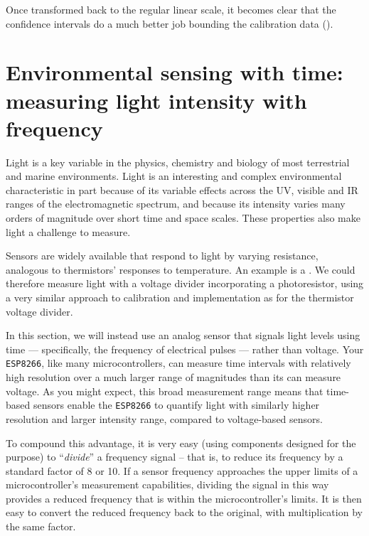 Once transformed back to the regular linear scale, it becomes clear that the confidence intervals do a much better job bounding the calibration data ().








\newpage


\section{Environmental sensing with time: measuring light intensity with frequency}
Light is a key variable in the physics, chemistry and biology of most terrestrial and marine environments.
Light is an interesting and complex environmental characteristic in part because of its variable effects across the UV, visible and IR ranges of the electromagnetic spectrum, and because its intensity varies many orders of magnitude over short time and space scales.
These properties also make light a challenge to measure.

Sensors are widely available that respond to light by varying resistance, analogous to thermistors' responses to temperature.
An example is a .
We could therefore measure light with a voltage divider incorporating a photoresistor, using a very similar approach to calibration and implementation as for the thermistor voltage divider.

In this section, we will instead use an analog sensor that signals light levels using time --- specifically, the frequency of electrical pulses --- rather than voltage.
Your \texttt{ESP8266}, like many microcontrollers, can measure time intervals with relatively high resolution over a much larger range of magnitudes than its \adc can measure voltage.
As you might expect, this broad measurement range means that time-based sensors enable the \texttt{ESP8266} to quantify light with similarly higher resolution and larger intensity range, compared to voltage-based sensors.

To compound this advantage, it is very easy (using components designed for the purpose) to ``\emph{divide}'' a frequency signal -- that is, to reduce its frequency by a standard factor of 8 or 10.
If a sensor frequency approaches the upper limits of a microcontroller's measurement capabilities, dividing the signal in this way provides a reduced frequency that is within the microcontroller's limits.
It is then easy to convert the reduced frequency back to the original, with multiplication by the same factor.

